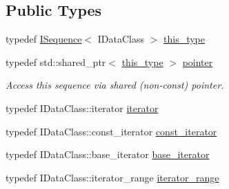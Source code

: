 \subsection*{Public Types}
\begin{DoxyCompactItemize}
\item 
typedef \hyperlink{class_wire_cell_1_1_i_sequence}{I\+Sequence}$<$ I\+Data\+Class $>$ \hyperlink{class_wire_cell_1_1_i_sequence_aae676a1415a6c843082041fb7f38b963}{this\+\_\+type}
\item 
typedef std\+::shared\+\_\+ptr$<$ \hyperlink{class_wire_cell_1_1_i_sequence_aae676a1415a6c843082041fb7f38b963}{this\+\_\+type} $>$ \hyperlink{class_wire_cell_1_1_i_sequence_aad75bbc31a91c10119d21d458129c05c}{pointer}
\begin{DoxyCompactList}\small\item\em Access this sequence via shared (non-\/const) pointer. \end{DoxyCompactList}\item 
typedef I\+Data\+Class\+::iterator \hyperlink{class_wire_cell_1_1_i_sequence_ac9bcf643972944d21c90743d9281f47a}{iterator}
\item 
typedef I\+Data\+Class\+::const\+\_\+iterator \hyperlink{class_wire_cell_1_1_i_sequence_a70e983c18db65df4337838592fa9fd9d}{const\+\_\+iterator}
\item 
typedef I\+Data\+Class\+::base\+\_\+iterator \hyperlink{class_wire_cell_1_1_i_sequence_af99d3e9815ec440bd96ca06a6e65f26c}{base\+\_\+iterator}
\item 
typedef I\+Data\+Class\+::iterator\+\_\+range \hyperlink{class_wire_cell_1_1_i_sequence_ac49f0584f3aaafc13a525953ebafad95}{iterator\+\_\+range}
\end{DoxyCompactItemize}
